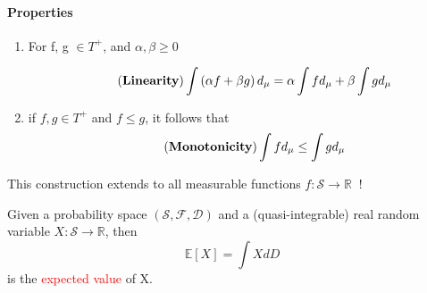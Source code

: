\documentclass[10pt,a4paper]{article}
\theoremstyle{definition}
\theoremstyle{plain}
\begin{document}
\paragraph{Properties} 
\begin{enumerate}
	\item For f, g $\in T^+$, and $\alpha, \beta \geq 0$ 
	
	\begin{equation}
		\tag{\textbf{Linearity}}
	 	\int \left(\alpha f + \beta g\right)d_\mu = \alpha\int fd_\mu + \beta\int gd_\mu
	 \end{equation}
	\item  if $f, g \in T^+$ and $ f \leq g$, it follows that 
	\begin{equation}
		\tag{\textbf{Monotonicity}}
		\int fd_\mu \leq \int gd_\mu
	\end{equation}
\end{enumerate}
This construction extends to all measurable functions $f:\mathcal{ S}\to \mathbb{R}\ $ !

\begin{boxeddef}
	Given a probability space $\mathcal{(S, F, D)}$ and a (quasi-integrable) real random variable $X: \mathcal{S} \to \mathbb{R}$, then
	$$ \mathbb{E}[X] = \int XdD$$
	is the \textcolor{red}{expected value} of X.
\end{boxeddef}
\end{document}
